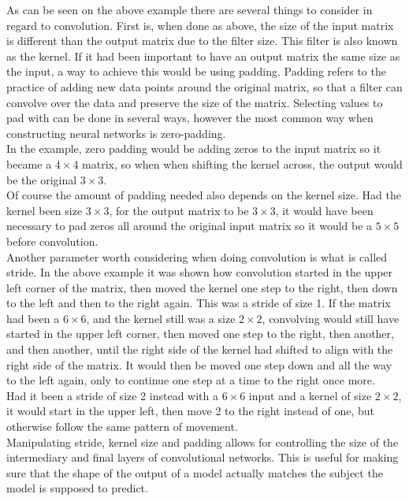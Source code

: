 As can be seen on the above example there are several things to consider in regard to convolution. First is, when done as above, the size of the input matrix is different than the output matrix due to the filter size. This filter is also known as the kernel. If it had been important to have an output matrix the same size as the input, a way to achieve this would be using padding. Padding refers to the practice of adding new data points around the original matrix, so that a filter can convolve over the data and preserve the size of the matrix. Selecting values to pad with can be done in several ways, however the most common way when constructing neural networks is zero-padding. \\
In the example, zero padding would be adding zeros to the input matrix so it became a $4\times4$ matrix, so when when shifting the kernel across, the output would be the original $3\times3$. \\
Of course the amount of padding needed also depends on the kernel size. Had the kernel been size $3\times3$, for the output matrix to be $3\times3$, it would have been necessary to pad zeros all around the original input matrix so it would be a $5\times5$ before convolution. \\
Another parameter worth considering when doing convolution is what is called stride. In the above example it was shown how convolution started in the upper left corner of the matrix, then moved the kernel one step to the right, then down to the left and then to the right again. This was a stride of size 1. If the matrix had been a $6\times6$, and the kernel still was a size $2\times2$, convolving would still have started in the upper left corner, then moved one step to the right, then another, and then another, until the right side of the kernel had shifted to align with the right side of the matrix. It would then be moved one step down and all the way to the left again, only to continue one step at a time to the right once more. \\
Had it been a stride of size 2 instead with a $6\times6$ input and a kernel of size $2\times2$, it would start in the upper left, then move 2 to the right instead of one, but otherwise follow the same pattern of movement. \\
Manipulating stride, kernel size and padding allows for controlling the size of the intermediary and final layers of convolutional networks. This is useful for making sure that the shape of the output of a model actually matches the subject the model is supposed to predict.

